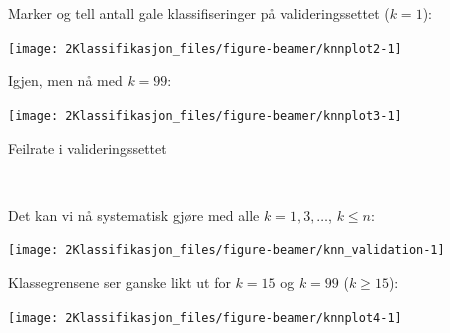 \documentclass[10pt,ignorenonframetext,]{beamer}
\begin{document}
\begin{frame}

Marker og tell antall gale klassifiseringer på valideringssettet
(\(k=1\)):

\begin{center}\texttt{[image: 2Klassifikasjon\_files/figure-beamer/knnplot2-1]} \end{center}

\end{frame}

\begin{frame}

Igjen, men nå med \(k=99\):

\begin{center}\texttt{[image: 2Klassifikasjon\_files/figure-beamer/knnplot3-1]} \end{center}

\end{frame}

\begin{frame}

\begin{block}{Feilrate i valideringssettet}

\(~\)

Det kan vi nå systematisk gjøre med alle \(k=1,3,\ldots\), \(k\leq n\):

\vspace{5mm}

\begin{center}\texttt{[image: 2Klassifikasjon\_files/figure-beamer/knn\_validation-1]} \end{center}

\end{block}

\end{frame}

\begin{frame}

Klassegrensene ser ganske likt ut for \(k=15\) og \(k=99\)
(\(k\geq 15\)):

\begin{center}\texttt{[image: 2Klassifikasjon\_files/figure-beamer/knnplot4-1]} \end{center}

\end{frame}
\end{document}
